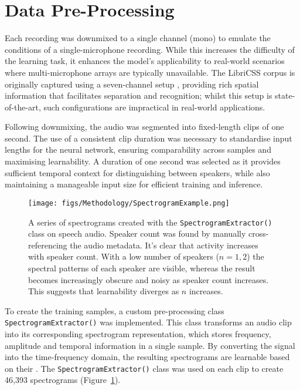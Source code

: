 \section{Data Pre-Processing}
Each recording was downmixed to a single channel (mono) to emulate the conditions of a single-microphone recording. While this increases the difficulty of the learning task, it enhances the model's applicability to real-world scenarios where multi-microphone arrays are typically unavailable. The LibriCSS corpus is originally captured using a seven-channel setup \cite{libricss}, providing rich spatial information that facilitates separation and recognition; whilst this setup is state-of-the-art, such configurations are impractical in real-world applications.

Following downmixing, the audio was segmented into fixed-length clips of one second. The use of a consistent clip duration was necessary to standardise input lengths for the neural network, ensuring comparability across samples and maximising learnability. A duration of one second was selected as it provides sufficient temporal context for distinguishing between speakers, while also maintaining a manageable input size for efficient training and inference.

\begin{figure}[H]
  \centering
  \texttt{[image: figs/Methodology/SpectrogramExample.png]}
  \caption{A series of spectrograms created with the \lstinline!SpectrogramExtractor()! class on speech audio. Speaker count was found by manually cross-referencing the audio metadata. It's clear that activity increases with speaker count. With a low number of speakers ($n = 1, 2$) the spectral patterns of each speaker are visible, whereas the result becomes increasingly obscure and noisy as speaker count increases. This suggests that learnability diverges as $n$ increases.}
  \label{fig:spec_samples}
\end{figure}

To create the training samples, a custom pre-processing class \lstinline!SpectrogramExtractor()! was implemented. This class transforms an audio clip into its corresponding spectrogram representation, which stores frequency, amplitude and temporal information in a single sample. By converting the signal into the time-frequency domain, the resulting spectrograms are learnable based on their . The \lstinline!SpectrogramExtractor()! class was used on each clip to create 46,393 spectrograms (Figure~\ref{fig:spec_samples}).

